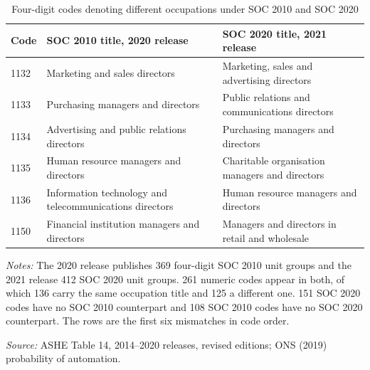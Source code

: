 \begin{table}[!ht]\centering
\caption{Four-digit codes denoting different occupations under SOC 2010 and SOC 2020}\label{tab:soc}
\begin{threeparttable}\footnotesize\setlength{\tabcolsep}{4pt}
\begin{tabular}{lp{}p{}}\toprule
Code & SOC 2010 title, 2020 release & SOC 2020 title, 2021 release \\ \midrule
1132 & Marketing and sales directors & Marketing, sales and advertising directors \\
1133 & Purchasing managers and directors & Public relations and communications directors \\
1134 & Advertising and public relations directors & Purchasing managers and directors \\
1135 & Human resource managers and directors & Charitable organisation managers and directors \\
1136 & Information technology and telecommunications directors & Human resource managers and directors \\
1150 & Financial institution managers and directors & Managers and directors in retail and wholesale \\
\bottomrule\end{tabular}
\begin{tablenotes}\footnotesize
\item \emph{Notes:} The 2020 release publishes 369 four-digit SOC 2010 unit groups and the 2021 release 412 SOC 2020 unit groups. 261 numeric codes appear in both, of which 136 carry the same occupation title and 125 a different one. 151 SOC 2020 codes have no SOC 2010 counterpart and 108 SOC 2010 codes have no SOC 2020 counterpart. The rows are the first six mismatches in code order.
\item \emph{Source:} ASHE Table 14, 2014--2020 releases, revised editions; ONS (2019) probability of automation.
\end{tablenotes}\end{threeparttable}\end{table}